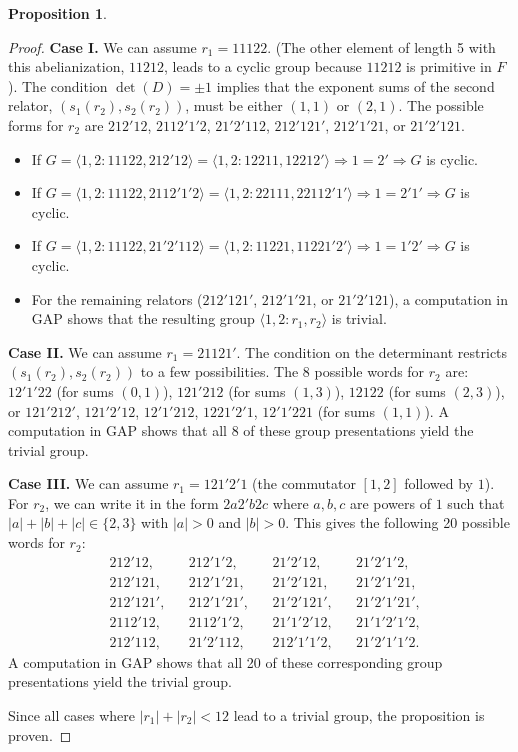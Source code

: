 \documentclass[pdflatex,sn-mathphys-num]{sn-jnl}%
\theoremstyle{plain}
\theoremstyle{definition}
\newtheorem{proposition}[theorem]{Proposition}
\theoremstyle{remark}
\begin{document}
\begin{proposition}
\begin{proof}
\textbf{Case I.}
We can assume $r_1 = 11122$. (The other element of length 5 with this abelianization, $11212$, leads to a cyclic group 
because $11212$ is primitive in $F$). The condition $\det(D) = \pm 1$ implies that the exponent sums of the second relator, $(s_1(r_2), s_2(r_2))$, must be either $(1, 1)$ or $(2, 1)$. The possible forms for $r_2$ are $212'12$, $2112'1'2$, $21'2'112$, $212'121'$, $212'1'21$, or $21'2'121$.
\begin{itemize}
    \item If $G = \langle 1,2: 11122, 212'12 \rangle = \langle 1,2: 12211, 12212' \rangle \Rightarrow 1=2' \Rightarrow G$ is cyclic.
    \item If $G = \langle 1,2: 11122, 2112'1'2 \rangle = \langle 1,2: 22111, 22112'1' \rangle \Rightarrow 1=2'1' \Rightarrow G$ is cyclic.
    \item If $G = \langle 1,2: 11122, 21'2'112 \rangle = \langle 1,2: 11221, 11221'2' \rangle \Rightarrow 1=1'2' \Rightarrow G$ is cyclic.
    \item For the remaining relators ($212'121'$, $212'1'21$, or $21'2'121$), a computation in GAP shows that the resulting group $\langle 1,2: r_1, r_2 \rangle$ is trivial.
\end{itemize}

\textbf{Case II.}
We can assume $r_1 = 21121'$. The condition on the determinant restricts $(s_1(r_2), s_2(r_2))$ to a few possibilities. The 8 possible words for $r_2$ are: $12'1'22$ (for sums $(0,1)$), $121'212$ (for sums $(1,3)$), $12122$ (for sums $(2,3)$), or $121'212'$, $121'2'12$, $12'1'212$, $1221'2'1$, $12'1'221$ (for sums $(1,1)$). A computation in GAP shows that all 8 of these group presentations yield the trivial group.

\textbf{Case III.}
We can assume $r_1 = 121'2'1$ (the commutator $[1,2]$ followed by $1$). For $r_2$, we can write it in the form $2a2'b2c$ where $a,b,c$ are powers of $1$ such that $|a|+|b|+|c| \in \{2,3\}$ with $|a|>0$ and $|b|>0$. This gives the following 20 possible words for $r_2$:
\begin{align*}
& 212'12, && 212'1'2, && 21'2'12, && 21'2'1'2,  \\
& 212'121, && 212'1'21, && 21'2'121, && 21'2'1'21, \\
& 212'121', && 212'1'21', && 21'2'121', && 21'2'1'21', \\
& 2112'12, && 2112'1'2, && 21'1'2'12, && 21'1'2'1'2, \\
& 212'112, && 21'2'112, && 212'1'1'2, && 21'2'1'1'2.
\end{align*}
A computation in GAP shows that all 20 of these corresponding group presentations yield the trivial group.

Since all cases where $|r_1|+|r_2|<12$ lead to a trivial group, the proposition is proven.
\end{proof}
\end{proposition}
\end{document}
